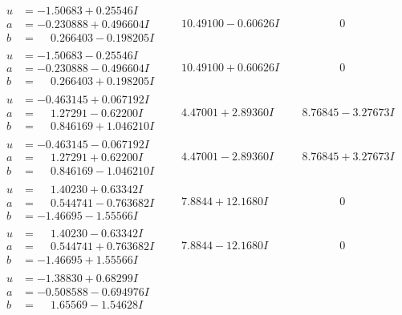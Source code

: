 \documentclass[1p]{elsarticle_modified}
\theoremstyle{definition}
\begin{document}
$$\begin{array}{c|c|c}
\begin{aligned}
u &= -1.50683 + 0.25546 I \\
a &= -0.230888 + 0.496604 I \\
b &= \phantom{-}0.266403 - 0.198205 I\end{aligned}
 & \phantom{-}10.49100 - 0.60626 I & \phantom{-0.000000 } 0 \\ \hline\begin{aligned}
u &= -1.50683 - 0.25546 I \\
a &= -0.230888 - 0.496604 I \\
b &= \phantom{-}0.266403 + 0.198205 I\end{aligned}
 & \phantom{-}10.49100 + 0.60626 I & \phantom{-0.000000 } 0 \\ \hline\begin{aligned}
u &= -0.463145 + 0.067192 I \\
a &= \phantom{-}1.27291 - 0.62200 I \\
b &= \phantom{-}0.846169 + 1.046210 I\end{aligned}
 & \phantom{-}4.47001 + 2.89360 I & \phantom{-}8.76845 - 3.27673 I \\ \hline\begin{aligned}
u &= -0.463145 - 0.067192 I \\
a &= \phantom{-}1.27291 + 0.62200 I \\
b &= \phantom{-}0.846169 - 1.046210 I\end{aligned}
 & \phantom{-}4.47001 - 2.89360 I & \phantom{-}8.76845 + 3.27673 I \\ \hline\begin{aligned}
u &= \phantom{-}1.40230 + 0.63342 I \\
a &= \phantom{-}0.544741 - 0.763682 I \\
b &= -1.46695 - 1.55566 I\end{aligned}
 & \phantom{-}7.8844 + 12.1680 I & \phantom{-0.000000 } 0 \\ \hline\begin{aligned}
u &= \phantom{-}1.40230 - 0.63342 I \\
a &= \phantom{-}0.544741 + 0.763682 I \\
b &= -1.46695 + 1.55566 I\end{aligned}
 & \phantom{-}7.8844 - 12.1680 I & \phantom{-0.000000 } 0 \\ \hline\begin{aligned}
u &= -1.38830 + 0.68299 I \\
a &= -0.508588 - 0.694976 I \\
b &= \phantom{-}1.65569 - 1.54628 I\end{aligned}

\end{array}$$
\end{document}
